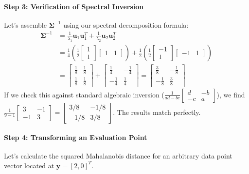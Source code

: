 \documentclass{article}
\begin{document}
\paragraph{Step 3: Verification of Spectral Inversion}
Let's assemble $\boldsymbol{\Sigma}^{-1}$ using our spectral decomposition formula:
\begin{align*}
\boldsymbol{\Sigma}^{-1} &= \frac{1}{\lambda_1}\mathbf{u}_1\mathbf{u}_1^T + \frac{1}{\lambda_2}\mathbf{u}_2\mathbf{u}_2^T \\
&= \frac{1}{4} \left( \frac{1}{2} \begin{bmatrix} 1 \\ 1 \end{bmatrix} \begin{bmatrix} 1 & 1 \end{bmatrix} \right) + \frac{1}{2} \left( \frac{1}{2} \begin{bmatrix} -1 \\ 1 \end{bmatrix} \begin{bmatrix} -1 & 1 \end{bmatrix} \right) \\
&= \begin{bmatrix} \frac{1}{8} & \frac{1}{8} \\ \frac{1}{8} & \frac{1}{8} \end{bmatrix} + \begin{bmatrix} \frac{1}{4} & -\frac{1}{4} \\ -\frac{1}{4} & \frac{1}{4} \end{bmatrix} = \begin{bmatrix} \frac{3}{8} & -\frac{1}{8} \\ -\frac{1}{8} & \frac{3}{8} \end{bmatrix}
\end{align*}
If we check this against standard algebraic inversion ($ \frac{1}{ad-bc}\begin{bmatrix} d & -b \\ -c & a \end{bmatrix} $), we find $\frac{1}{9-1}\begin{bmatrix} 3 & -1 \\ -1 & 3 \end{bmatrix} = \begin{bmatrix} 3/8 & -1/8 \\ -1/8 & 3/8 \end{bmatrix}$. The results match perfectly.

\paragraph{Step 4: Transforming an Evaluation Point}
Let's calculate the squared Mahalanobis distance for an arbitrary data point vector located at $\mathbf{y} = [2, 0]^T$. 
\end{document}
